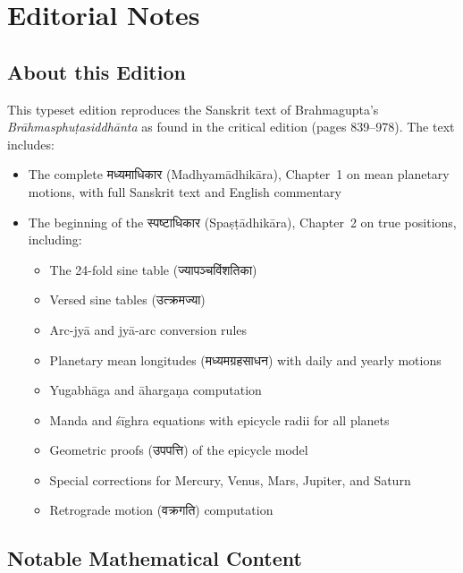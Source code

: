 \documentclass[11pt,a4paper]{book}
\newcommand{\dev}[1]{{\devanagarifont #1}}
\begin{document}
\clearpage

\appendix
\chapter{Editorial Notes}

\section{About this Edition}

This typeset edition reproduces the Sanskrit text of Brahmagupta's \emph{Brāhmasphuṭasiddhānta} as found in the critical edition (pages 839--978). The text includes:

\begin{itemize}
\item The complete \dev{मध्यमाधिकार} (Madhyamādhikāra), Chapter~1 on mean planetary motions, with full Sanskrit text and English commentary
\item The beginning of the \dev{स्पष्टाधिकार} (Spaṣṭādhikāra), Chapter~2 on true positions, including:
  \begin{itemize}
  \item The 24-fold sine table (\dev{ज्यापञ्चविंशतिका})
  \item Versed sine tables (\dev{उत्क्रमज्या})
  \item Arc-jyā and jyā-arc conversion rules
  \item Planetary mean longitudes (\dev{मध्यमग्रहसाधन}) with daily and yearly motions
  \item Yugabhāga and āhargaṇa computation
  \item Manda and śīghra equations with epicycle radii for all planets
  \item Geometric proofs (\dev{उपपत्ति}) of the epicycle model
  \item Special corrections for Mercury, Venus, Mars, Jupiter, and Saturn
  \item Retrograde motion (\dev{वक्रगति}) computation
  \end{itemize}
\end{itemize}

\section{Notable Mathematical Content}
\end{document}
